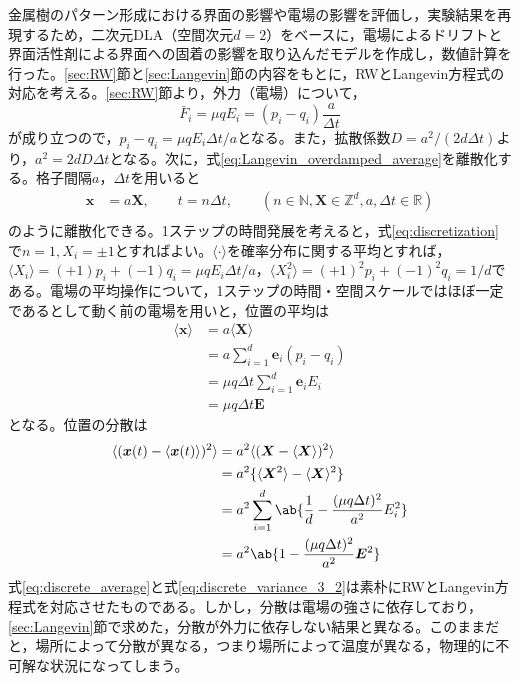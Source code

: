 \documentclass[autodetect-engine,dvi=dvipdfmx,a4paper,ja=standard,oneside,openany,11pt]{bxjsbook}
\begin{document}
金属樹のパターン形成における界面の影響や電場の影響を評価し，実験結果を再現するため，二次元DLA（空間次元$d=2$）をベースに，電場によるドリフトと界面活性剤による界面への固着の影響を取り込んだモデルを作成し，数値計算を行った。\ref{sec:RW}節と\ref{sec:Langevin}節の内容をもとに，RWとLangevin方程式の対応を考える。\ref{sec:RW}節より，外力（電場）について，
\begin{equation}
  \bar{F}_i=\mu q E_i=(p_i-q_i)\frac{a}{\Delta t}
  \label{eq:force}
\end{equation}が成り立つので，$p_i-q_i=\mu q E_i\Delta t/a$となる。また，拡散係数$D=a^2/(2d\Delta t)$より，$a^2=2dD\Delta t$となる。次に，式\eqref{eq:Langevin_overdamped_average}を離散化する。格子間隔$a$，$\Delta t$を用いると
\begin{equation}
  \begin{split}
    \bm{x} & =a\bm{X}, \qquad t=n\Delta t, \qquad (n\in\mathbb{N},\bm{X}\in\mathbb{Z}^d,a,\Delta t \in \mathbb{R}) \\
    \label{eq:discretization}
  \end{split}
\end{equation}
のように離散化できる。1ステップの時間発展を考えると，式\eqref{eq:discretization}で$n=1,X_i=\pm1$とすればよい。$\langle\cdot\rangle$を確率分布に関する平均とすれば，$\langle X_i\rangle=(+1)p_i+(-1)q_i=\mu q E_i\Delta t/a$，$\langle X_i^2\rangle=(+1)^2p_i+(-1)^2q_i=1/d$である。電場の平均操作について，1ステップの時間・空間スケールではほぼ一定であるとして動く前の電場を用いと，位置の平均は
\begin{equation}
  \begin{split}
    \langle\bm{x}\rangle & =a\langle\bm{X}\rangle                     \\
                         & =a\sum_{i=1}^{d}\bm{e}_i(p_i-q_i)          \\
                         & =\mu q \Delta t\sum_{i=1}^{d} \bm{e}_i E_i \\
                         & =\mu q \Delta t\bm{E}
  \end{split}
  \label{eq:discrete_average}
\end{equation}
となる。位置の分散は
\begin{equation}
  \begin{aligned}
    \langle(\bm{x}(t)-\langle\bm{x}(t)\rangle)^2\rangle
     & =a^2\langle(\bm{X}-\langle\bm{X}\rangle)^2\rangle                        \\
     & =a^2\{\langle\bm{X}^2\rangle-\langle\bm{X}\rangle^2\}                    \\
     & =a^2\sum_{i=1}^{d}\ab\{\frac{1}{d}-\frac{(\mu q \Delta t)^2}{a^2}E_i^2\} \\
     & =a^2\ab\{1-\frac{(\mu q \Delta t)^2}{a^2}\bm{E}^2\}                      \\
  \end{aligned}
  \label{eq:discrete_variance_3_2}
\end{equation}
式\eqref{eq:discrete_average}と式\eqref{eq:discrete_variance_3_2}は素朴にRWとLangevin方程式を対応させたものである。しかし，分散は電場の強さに依存しており，\ref{sec:Langevin}節で求めた，分散が外力に依存しない結果と異なる。このままだと，場所によって分散が異なる，つまり場所によって温度が異なる，物理的に不可解な状況になってしまう。
\end{document}
